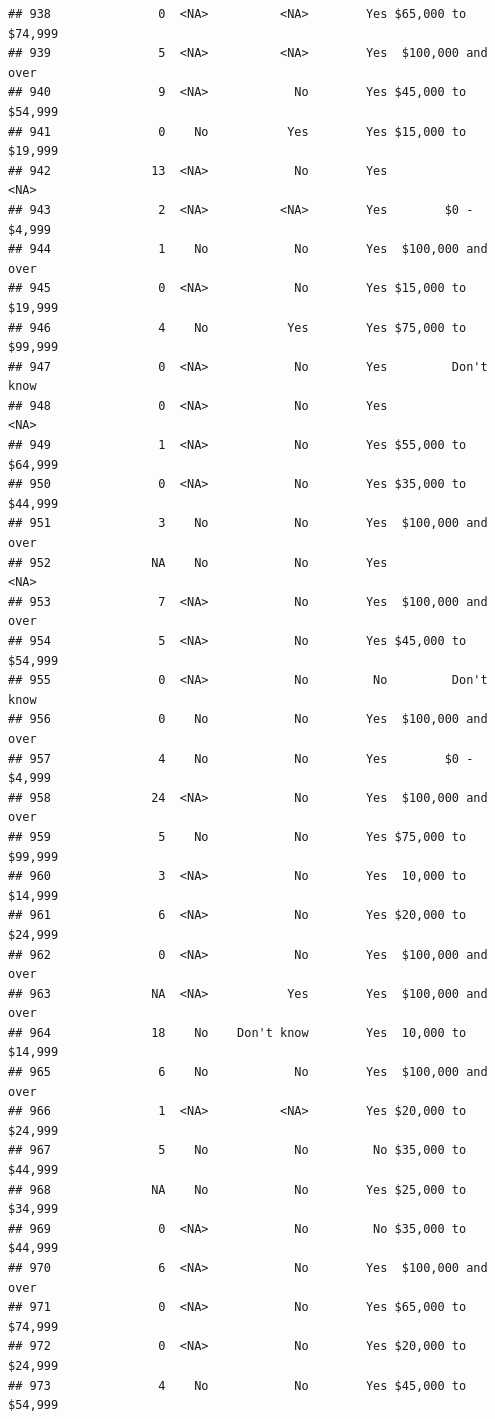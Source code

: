 \documentclass[man]{apa6}
\begin{document}
\begin{verbatim}
## 938               0  <NA>          <NA>        Yes $65,000 to $74,999
## 939               5  <NA>          <NA>        Yes  $100,000 and over
## 940               9  <NA>            No        Yes $45,000 to $54,999
## 941               0    No           Yes        Yes $15,000 to $19,999
## 942              13  <NA>            No        Yes               <NA>
## 943               2  <NA>          <NA>        Yes        $0 - $4,999
## 944               1    No            No        Yes  $100,000 and over
## 945               0  <NA>            No        Yes $15,000 to $19,999
## 946               4    No           Yes        Yes $75,000 to $99,999
## 947               0  <NA>            No        Yes         Don't know
## 948               0  <NA>            No        Yes               <NA>
## 949               1  <NA>            No        Yes $55,000 to $64,999
## 950               0  <NA>            No        Yes $35,000 to $44,999
## 951               3    No            No        Yes  $100,000 and over
## 952              NA    No            No        Yes               <NA>
## 953               7  <NA>            No        Yes  $100,000 and over
## 954               5  <NA>            No        Yes $45,000 to $54,999
## 955               0  <NA>            No         No         Don't know
## 956               0    No            No        Yes  $100,000 and over
## 957               4    No            No        Yes        $0 - $4,999
## 958              24  <NA>            No        Yes  $100,000 and over
## 959               5    No            No        Yes $75,000 to $99,999
## 960               3  <NA>            No        Yes  10,000 to $14,999
## 961               6  <NA>            No        Yes $20,000 to $24,999
## 962               0  <NA>            No        Yes  $100,000 and over
## 963              NA  <NA>           Yes        Yes  $100,000 and over
## 964              18    No    Don't know        Yes  10,000 to $14,999
## 965               6    No            No        Yes  $100,000 and over
## 966               1  <NA>          <NA>        Yes $20,000 to $24,999
## 967               5    No            No         No $35,000 to $44,999
## 968              NA    No            No        Yes $25,000 to $34,999
## 969               0  <NA>            No         No $35,000 to $44,999
## 970               6  <NA>            No        Yes  $100,000 and over
## 971               0  <NA>            No        Yes $65,000 to $74,999
## 972               0  <NA>            No        Yes $20,000 to $24,999
## 973               4    No            No        Yes $45,000 to $54,999

\end{verbatim}
\end{document}
